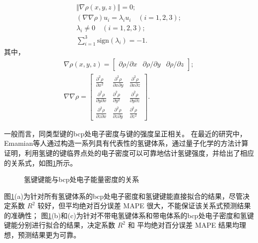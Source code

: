 \begin{gather}
    \Vert \nabla\rho(x,y,z)  \Vert = 0; \\
    (\nabla\nabla\rho)u_i = \lambda_i u_i\quad (i=1,2,3); \\
    \lambda_i \neq 0 \quad (i=1,2,3); \\
    \sum_{i=1}^3\text{sign}(\lambda_i) = -1.  
\end{gather}
其中，
\begin{gather}
    \nabla\rho(x,y,z) = 
    \begin{bmatrix}
        \partial\rho/\partial x & \partial\rho/\partial y & \partial\rho/\partial z
    \end{bmatrix}; \\
    \nabla\nabla\rho= 
    \begin{bmatrix}
        \displaystyle\frac{\partial^2 \rho}{\partial x^2} & \displaystyle\frac{\partial^2 \rho}{\partial x\partial y} & \displaystyle\frac{\partial^2 \rho}{\partial x \partial z} \\
        \displaystyle\frac{\partial^2 \rho }{\partial y \partial x} & \displaystyle\frac{\partial^2 \rho }{\partial y^2} & \displaystyle\frac{\partial^2 \rho }{\partial y \partial z} \\
        \displaystyle\frac{\partial^2 \rho }{\partial z \partial x} & \displaystyle\frac{\partial^2 \rho }{\partial z \partial y} & \displaystyle\frac{\partial^2 \rho }{\partial z^2}
    \end{bmatrix}.
\end{gather}

一般而言，同类型键的bcp处电子密度与键的强度呈正相关。
在最近的研究中，Emamian等人通过构造一系列具有代表性的氢键体系，通过量子化学的方法计算证明，利用氢键的键临界点处的电子密度可以可靠地估计氢键强度，并给出了相应的关系式，如图\ref{fig:bcp-energy}所示。

\begin{figure}[htbp]
    \centering
    \caption{氢键键能与bcp处电子能量密度的关系}
    \label{fig:bcp-energy}
\end{figure}

图\ref{fig:bcp-energy}(a)为针对所有氢键体系的bcp处电子密度和氢键键能直接拟合的结果，尽管决定系数 $R^2$ 较好，但平均绝对百分误差 MAPE 很大，不能保证该关系式预测结果的准确性；
图\ref{fig:bcp-energy}(b)和(c)为针对不带电氢键体系和带电体系的bcp处电子密度和氢键键能分别进行拟合的结果，决定系数 $R^2$ 和 平均绝对百分误差 MAPE 结果均理想，预测结果更为可靠。

